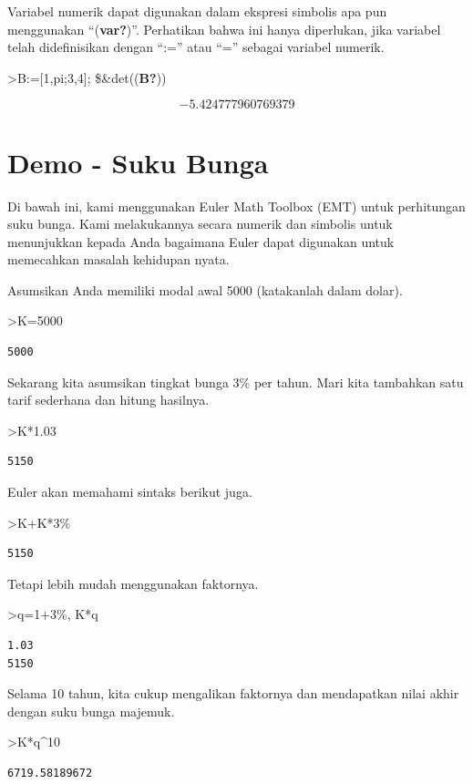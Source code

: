 \documentclass[
]{book}
\begin{document}
Variabel numerik dapat digunakan dalam ekspresi simbolis apa pun menggunakan ``(\textbf{var?})''. Perhatikan bahwa ini hanya diperlukan, jika variabel telah didefinisikan dengan ``:='' atau ``='' sebagai variabel numerik.

\textgreater B:={[}1,pi;3,4{]}; \$\&det((\textbf{B?}))

\[-5.424777960769379\]

\section{Demo - Suku Bunga}\label{demo---suku-bunga}

Di bawah ini, kami menggunakan Euler Math Toolbox (EMT) untuk perhitungan suku bunga. Kami melakukannya secara numerik dan simbolis untuk menunjukkan kepada Anda bagaimana Euler dapat digunakan untuk memecahkan masalah kehidupan nyata.

Asumsikan Anda memiliki modal awal 5000 (katakanlah dalam dolar).

\textgreater K=5000

\begin{verbatim}
5000
\end{verbatim}

Sekarang kita asumsikan tingkat bunga 3\% per tahun. Mari kita tambahkan satu tarif sederhana dan hitung hasilnya.

\textgreater K*1.03

\begin{verbatim}
5150
\end{verbatim}

Euler akan memahami sintaks berikut juga.

\textgreater K+K*3\%

\begin{verbatim}
5150
\end{verbatim}

Tetapi lebih mudah menggunakan faktornya.

\textgreater q=1+3\%, K*q

\begin{verbatim}
1.03
5150
\end{verbatim}

Selama 10 tahun, kita cukup mengalikan faktornya dan mendapatkan nilai akhir dengan suku bunga majemuk.

\textgreater K*q\^{}10

\begin{verbatim}
6719.58189672
\end{verbatim}
\end{document}
